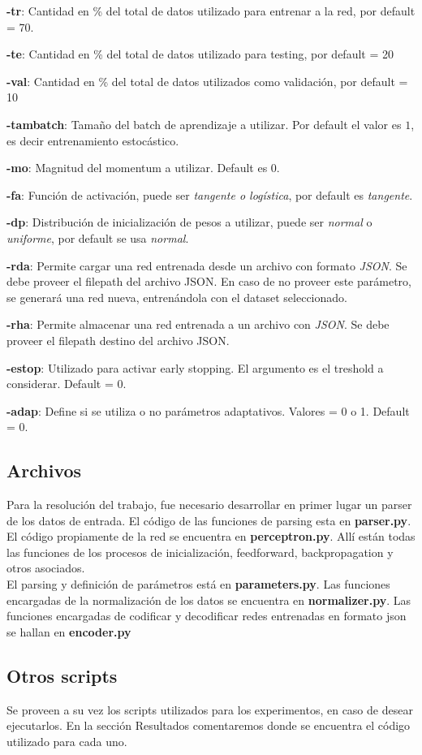 \textbf{-tr}:  Cantidad en \% del total de datos utilizado para entrenar a la red, por default = 70.

\textbf{-te}: Cantidad en \% del total de datos utilizado para testing, por default = 20

\textbf{-val}: Cantidad en \% del total de datos utilizados como validación, por default = 10

\textbf{-tambatch}: Tamaño del batch de aprendizaje a utilizar. Por default el valor es $1$, es decir entrenamiento estocástico.

\textbf{-mo}: Magnitud del momentum a utilizar. Default es 0.

\textbf{-fa}: Función de activación, puede ser \textit{tangente o logística}, por default es \textit{tangente}.

\textbf{-dp}: Distribución de inicialización de pesos a utilizar, puede ser \textit{normal} o \textit{uniforme}, por default se usa \textit{normal}.

\textbf{-rda}: Permite cargar una red entrenada desde un archivo con formato \textit{JSON}. Se debe proveer el filepath del archivo JSON. En caso de no proveer este parámetro, se generará una red nueva, entrenándola con el dataset seleccionado.

\textbf{-rha}: Permite almacenar una red entrenada a un archivo con \textit{JSON}. Se debe proveer el filepath destino del archivo JSON.

\textbf{-estop}: Utilizado para activar early stopping. El argumento es el treshold a considerar. Default = 0.

\textbf{-adap}: Define si se utiliza o no parámetros adaptativos. Valores = 0 o 1. Default = 0.

\subsection{Archivos}
Para la resolución del trabajo, fue necesario desarrollar en primer lugar un parser de los datos de entrada. El código de las funciones de parsing esta en \textbf{parser.py}.\\

El código propiamente de la red se encuentra en \textbf{perceptron.py}. Allí están todas las funciones de los procesos de inicialización, feedforward, backpropagation y otros asociados.\\

El parsing y definición de parámetros está en \textbf{parameters.py}. Las funciones encargadas de la normalización de los datos se encuentra en \textbf{normalizer.py}. Las funciones encargadas de codificar y decodificar redes entrenadas en formato json se hallan en \textbf{encoder.py}


\subsection{Otros scripts}

Se proveen a su vez los scripts utilizados para los experimentos, en caso de desear ejecutarlos. En la sección Resultados comentaremos donde se encuentra el código utilizado para cada uno.
